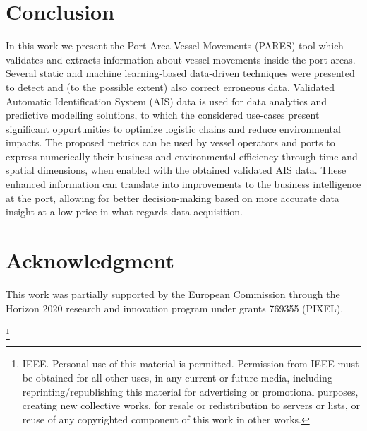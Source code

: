 \documentclass[conference]{IEEEtran}
\begin{document}


\section{Conclusion}

In this work we present the Port Area Vessel Movements (PARES) tool which validates and extracts information about vessel movements inside the port areas. Several static and machine learning-based data-driven techniques were presented to detect and (to the possible extent) also correct erroneous data. Validated Automatic Identification System (AIS) data is used for data analytics and predictive modelling solutions, to which the considered use-cases present significant opportunities to optimize logistic chains and reduce environmental impacts. The proposed metrics can be used by vessel operators and ports to express numerically their business and environmental efficiency through time and spatial dimensions, when enabled with the obtained validated AIS data. These enhanced information can translate into improvements to the business intelligence at the port, allowing for better decision-making based on more accurate data insight at a low price in what regards data acquisition. 

\section*{Acknowledgment}

This work was partially supported by the European Commission through the Horizon 2020 research and innovation program under grants 769355 (PIXEL).




\thanks{
 IEEE. Personal use of this material is permitted. Permission from IEEE must be obtained for all other uses, in any current or future media, including reprinting/republishing this material for advertising or promotional purposes, creating new collective works, for resale or redistribution to servers or lists, or reuse of any copyrighted component of this work in other works.
}
\end{document}
